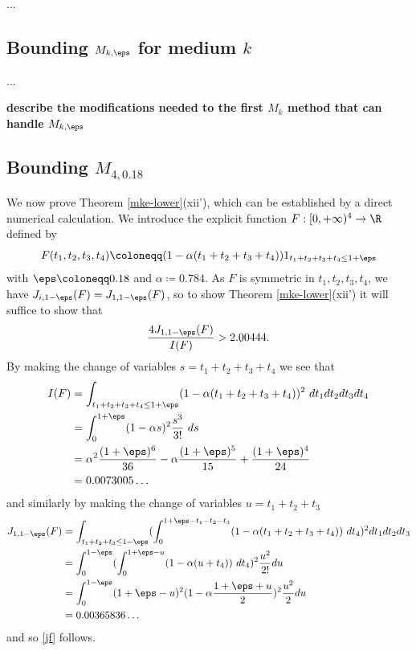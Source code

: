 ...

\subsection{Bounding \texorpdfstring{$M_{k,\eps}$}{Mk,epsilon} for medium \texorpdfstring{$k$}{k}}

...

{\bf describe the modifications needed to the first $M_k$ method that can handle $M_{k,\eps}$}

\subsection{Bounding \texorpdfstring{$M_{4,0.18}$}{M4,0.18}}

We now prove Theorem \ref{mke-lower}(xii'), which can be established by a direct numerical calculation.  We introduce the explicit function $F: [0,+\infty)^4 \to \R$ defined by 
$$ F(t_1,t_2,t_3,t_4) \coloneqq (1 - \alpha (t_1+t_2+t_3+t_4)) 1_{t_1+t_2+t_3+t_4 \leq 1+\eps}$$
with $\eps \coloneqq 0.18$ and $\alpha \coloneqq 0.784$.  As $F$ is symmetric in $t_1,t_2,t_3,t_4$, we have $J_{i,1-\eps}(F) = J_{1,1-\eps}(F)$, so to show Theorem \ref{mke-lower}(xii') it will suffice to show that
\begin{equation}\label{jf}
 \frac{4 J_{1,1-\eps}(F)}{I(F)} > 2.00444.
\end{equation}
By making the change of variables $s=t_1+t_2+t_3+t_4$ we see that
\begin{align*}
I(F) &= \int_{t_1+t_2+t_3+t_4 \leq 1+\eps} (1-\alpha(t_1+t_2+t_3+t_4))^2\ dt_1 dt_2 dt_3 dt_4 \\
&= \int_0^{1+\eps} (1-\alpha s)^2 \frac{s^3}{3!}\ ds\\
&= \alpha^2 \frac{(1+\eps)^6}{36} - \alpha \frac{(1+\eps)^5}{15} + \frac{(1+\eps)^4}{24} \\
&= 0.0073005\dots
\end{align*}
and similarly by making the change of variables $u = t_1+t_2+t_3$
\begin{align*}
J_{1,1-\eps}(F) &= \int_{t_1+t_2+t_3 \leq 1-\eps} (\int_0^{1+\eps-t_1-t_2-t_3} (1-\alpha(t_1+t_2+t_3+t_4))\ dt_4)^2 dt_1 dt_2 dt_3 \\
&= \int_0^{1-\eps} (\int_0^{1+\eps-u} (1-\alpha(u+t_4))\ dt_4)^2 \frac{u^2}{2!} du \\
&= \int_0^{1-\eps} (1+\eps-u)^2 (1-\alpha \frac{1+\eps+u}{2})^2 \frac{u^2}{2} du  \\
&= 0.00365836\dots
\end{align*}
and so \eqref{jf} follows.

